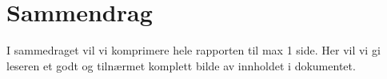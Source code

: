 \cleardoublepage

 \setcounter{page}{1}
\chapter*{Sammendrag}



I sammedraget vil vi komprimere hele rapporten  til max 1 side. Her vil vi gi leseren et godt og tilnærmet komplett bilde av innholdet i dokumentet.